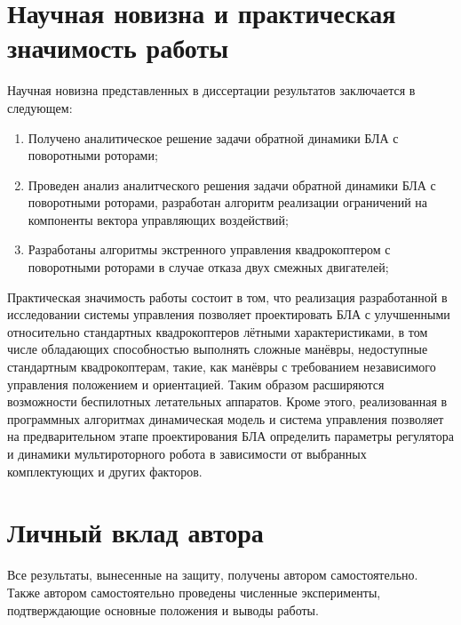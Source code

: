 \section{Научная новизна и практическая значимость работы}
Научная новизна представленных в диссертации результатов заключается в следующем:
\begin{enumerate}
	\item  Получено аналитическое решение задачи обратной динамики БЛА с поворотными роторами;
	\item  Проведен анализ аналитческого решения задачи обратной динамики  БЛА с поворотными роторами, разработан алгоритм реализации ограничений на компоненты вектора управляющих воздействий;
	\item  Разработаны алгоритмы экстренного управления квадрокоптером с поворотными роторами в случае отказа двух смежных двигателей;
\end{enumerate}
Практическая значимость работы состоит в том, что
реализация разработанной в исследовании системы управления позволяет проектировать БЛА с улучшенными относительно стандартных квадрокоптеров лётными характеристиками, в том числе обладающих способностью 
выполнять сложные манёвры, недоступные стандартным квадрокоптерам, такие, как манёвры с требованием независимого управления положением и ориентацией.
Таким образом расширяются возможности беспилотных летательных аппаратов.
Кроме этого, реализованная в программных алгоритмах динамическая модель и система управления позволяет на предварительном этапе проектирования БЛА определить параметры регулятора и динамики мультироторного робота в зависимости от выбранных комплектующих и других факторов.

\section{Личный вклад автора}
Все результаты, вынесенные на защиту, получены автором самостоятельно.
Также автором самостоятельно проведены численные эксперименты,
подтверждающие основные положения и выводы работы. 











